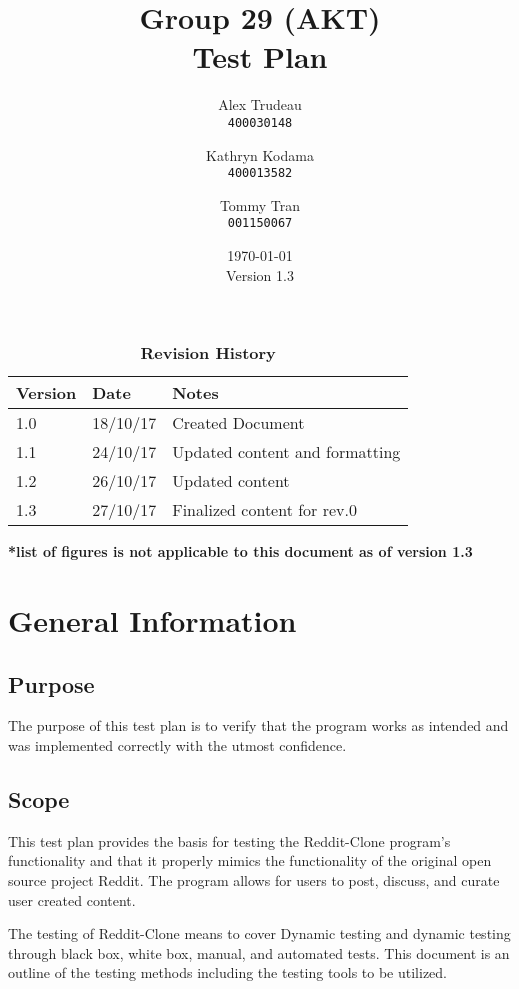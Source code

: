 \documentclass[12pt,fleqn]{article}
\title{Group 29 (AKT)\\ Test Plan}
\author{
Alex Trudeau\\
	\texttt{400030148}
\and
Kathryn Kodama\\
  	\texttt{400013582}
\and
Tommy Tran\\
	\texttt{001150067}
}
\date{\today\\Version 1.3}
\begin{document}
\maketitle



\pagebreak
\tableofcontents


\listoftables

\begin{table}[ht]
\caption{\bf Revision History}
\begin{tabularx}{\textwidth}{p{3cm}p{2cm}X}
\toprule {\bf Version} & {\bf Date} & {\bf Notes}\\
\midrule
1.0 & 18/10/17 & Created Document\\
1.1 & 24/10/17 & Updated  content and formatting\\
1.2 & 26/10/17 & Updated content
\\
1.3 & 27/10/17 & Finalized content for rev.0 \\
\bottomrule
\end{tabularx}
\textbf{*list of figures is not applicable to this document as of version 1.3}
\end{table}



\pagebreak



\section {General Information}

\subsection {Purpose}
The purpose of this test plan is to verify that the program works as intended and was implemented correctly with the utmost confidence.

\subsection {Scope}
This test plan provides the basis for testing the Reddit-Clone program's functionality and that it properly mimics the functionality of the original open source project Reddit.  The program allows for users to post, discuss, and curate user created content.

The testing of Reddit-Clone means to cover Dynamic testing and dynamic testing through black box, white box, manual, and automated tests.  This document is an outline of the testing methods including the testing tools to be utilized.
\end{document}
